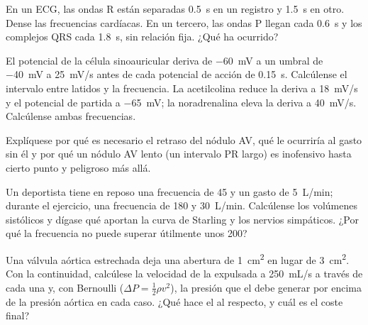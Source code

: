 \begin{exercise}[$\star\star$]\label{exo:b2:heart:7}
En un ECG, las ondas R están separadas \qty{0.5}{s} en un registro y
\qty{1.5}{s} en otro. Dense las frecuencias cardíacas. En un tercero, las
ondas P llegan cada \qty{0.6}{s} y los complejos QRS cada \qty{1.8}{s}, sin
relación fija. ¿Qué ha ocurrido?
\end{exercise}

\begin{exercise}[$\star\star$]\label{exo:b2:heart:8}
El potencial de la célula sinoauricular deriva de \qty{-60}{mV} a un umbral
de \qty{-40}{mV} a \qty{25}{mV/s} antes de cada potencial de acción de
\qty{0.15}{s}. Calcúlense el intervalo entre latidos y la frecuencia. La
acetilcolina reduce la deriva a \qty{18}{mV/s} y el potencial de partida a
\qty{-65}{mV}; la noradrenalina eleva la deriva a \qty{40}{mV/s}.
Calcúlense ambas frecuencias.
\end{exercise}

\begin{exercise}[$\star\star$]\label{exo:b2:heart:9}
Explíquese por qué es necesario el retraso del nódulo AV, qué le ocurriría
al gasto sin él y por qué un nódulo AV lento (un intervalo PR largo) es
inofensivo hasta cierto punto y peligroso más allá.
\end{exercise}

\begin{exercise}[$\star\star\star$]\label{exo:b2:heart:10}
Un deportista tiene en reposo una frecuencia de 45 y un gasto de
\qty{5}{L/min}; durante el ejercicio, una frecuencia de 180 y
\qty{30}{L/min}. Calcúlense los volúmenes sistólicos y dígase qué aportan
la curva de Starling y los nervios simpáticos. ¿Por qué la frecuencia no
puede superar útilmente unos 200?
\end{exercise}

\begin{exercise}[$\star\star\star$]\label{exo:b2:heart:11}
Una válvula aórtica estrechada deja una abertura de \qty{1}{cm^2} en lugar
de \qty{3}{cm^2}. Con la continuidad, calcúlese la velocidad de la 
expulsada a \qty{250}{mL/s} a través de cada una y, con Bernoulli
($\Delta P = \tfrac12\rho v^2$), la presión que el  debe
generar por encima de la presión aórtica en cada caso. ¿Qué hace el
 al respecto, y cuál es el coste final?
\end{exercise}

